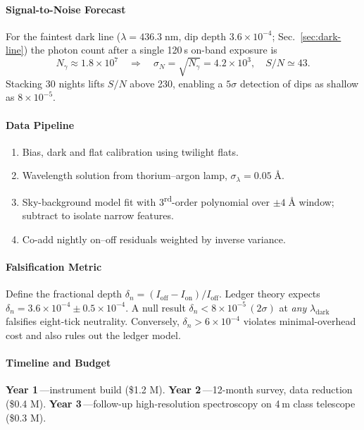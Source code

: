 \documentclass[11pt,oneside]{book}
\begin{document}
{\paragraph{Signal-to-Noise Forecast}

For the faintest dark line
(\(\lambda=436.3\;\text{nm}\),
dip depth 
\(3.6\times10^{-4}\);
Sec.~\ref{sec:dark-line})
the photon count after a single 120 s on-band exposure is
\[
   N_{\gamma}
   \approx
   1.8\times10^{7}
   \quad\Longrightarrow\quad
   \sigma_{N}=\sqrt{N_{\gamma}}=4.2\times10^{3},
   \quad
   S/N\simeq43.
\]
Stacking 30 nights lifts \(S/N\) above 230,
enabling a $5\sigma$ detection of dips
as shallow as $8\times10^{-5}$.

\paragraph{Data Pipeline}

\begin{enumerate}[leftmargin=*,itemsep=4pt]
\item Bias, dark and flat calibration using twilight flats.
\item Wavelength solution from thorium–argon lamp,
      \(\sigma_{\lambda}=0.05\;\text{Å}\).
\item Sky-background model fit with 3\textsuperscript{rd}-order
      polynomial over \(\pm4\;\text{Å}\) window; subtract to isolate
      narrow features.
\item Co-add nightly on–off residuals weighted by inverse variance.
\end{enumerate}

\paragraph{Falsification Metric}

Define the fractional depth
\(
   \delta_{n}=(I_{\text{off}}-I_{\text{on}})/I_{\text{off}}.
\)
Ledger theory expects
\(
   \delta_{n}=3.6\times10^{-4} \pm 0.5\times10^{-4}.
\)
A null result
\(
   \delta_{n}<8\times10^{-5} \,(2\sigma)
\)
at \emph{any} $\lambda_{\text{dark}}$ falsifies eight-tick neutrality.
Conversely,
\(\delta_{n}>6\times10^{-4}\) violates minimal-overhead cost and also
rules out the ledger model.

\paragraph*{Timeline and Budget}

\textbf{Year 1}\,—instrument build (\$1.2 M).  
\textbf{Year 2}\,—12-month survey, data reduction (\$0.4 M).
\textbf{Year 3}\,—follow-up high-resolution spectroscopy on
4 m class telescope (\$0.3 M).

}
\end{document}
